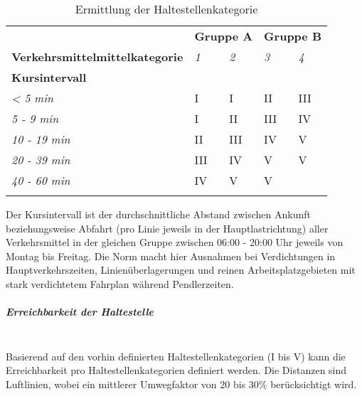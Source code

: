 \begin{longtable}[c]{l | p{2.3cm} p{2.3cm} | p{2.3cm} p{2.3cm}}
        \midrule
        \textbf{}
                                & \multicolumn{2}{l|}{\textbf{Gruppe A}}
                                & \multicolumn{2}{l}{\textbf{Gruppe B}}\\
        \textbf{Verkehrsmittelmittelkategorie}
                                & \textit{1}
                                & \textit{2}
                                & \textit{3}
                                & \textit{4}\\
        \textbf{Kursintervall}
                                &
                                &
                                &
                                &\\
        \textit{< 5 min}
                                & I
                                & I
                                & II
                                & III\\
        \textit{5 - 9 min}
                                & I
                                & II
                                & III
                                & IV\\
        \textit{10 - 19 min}
                                & II
                                & III
                                & IV
                                & V\\
        \textit{20 - 39 min}
                                & III
                                & IV
                                & V
                                & V\\
        \textit{40 - 60 min}
                                & IV
                                & V
                                & V
                                &\\
        \bottomrule
    \caption{Ermittlung der Haltestellenkategorie}
    \label{table:Ermittlung der Haltestellenkategorie}
\end{longtable}

Der Kursintervall ist der durchschnittliche Abstand zwischen Ankunft beziehungsweise Abfahrt (pro Linie jeweils in der Hauptlastrichtung) aller Verkehrsmittel in der gleichen Gruppe zwischen 06:00 - 20:00 Uhr jeweils von Montag bis Freitag.
Die Norm macht hier Ausnahmen bei Verdichtungen in Hauptverkehrszeiten, Linienüberlagerungen und reinen Arbeitsplatzgebieten mit stark verdichtetem Fahrplan während Pendlerzeiten.

\subparagraph{Erreichbarkeit der Haltestelle}~\\
\label{Definition ÖV-Güteklassen:Erreichbarkeit der Haltestelle}
Basierend auf den vorhin definierten Haltestellenkategorien (I bis V) kann die Erreichbarkeit pro Haltestellenkategorien definiert werden.
Die Distanzen sind Luftlinien, wobei ein mittlerer Umwegfaktor von 20 bis 30\% berücksichtigt wird.

